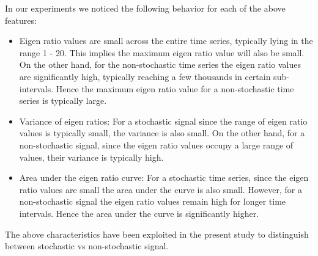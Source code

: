 \documentclass[10pt,conference]{IEEEtran}
\begin{document}
In our experiments we noticed the following behavior for each of the above features:
\begin{itemize}
  \item Eigen ratio values are small across the entire time series, typically lying in the range 1 - 20. This implies the maximum eigen ratio value will also be small. On the other hand, for the non-stochastic time series the eigen ratio values are significantly high, typically reaching a few thousands in certain sub-intervals. Hence the maximum eigen ratio value for a non-stochastic time series is typically large.
  \item Variance of eigen ratios: For a stochastic signal since the range of eigen ratio values is typically small, the variance is also small. On the other hand, for a non-stochastic signal, since the eigen ratio values occupy a large range of values, their variance is typically high.
  \item Area under the eigen ratio curve: For a stochastic time series, since the eigen ratio values are small the area under the curve is also small. However, for a non-stochastic signal the eigen ratio values remain high for longer time intervals. Hence the area under the curve is significantly higher.
\end{itemize}

The above characteristics have been exploited in the present study to distinguish between stochastic vs non-stochastic signal.
\end{document}
